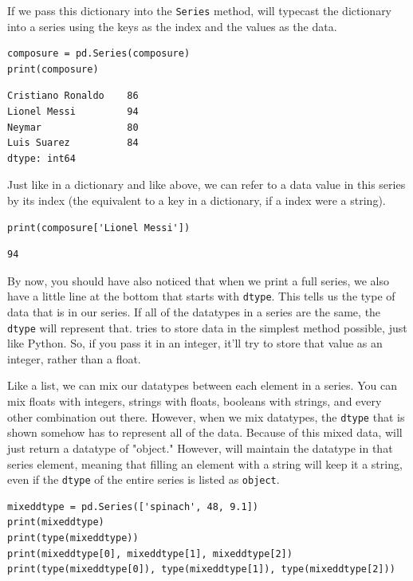 If we pass this dictionary into the \verb|Series| method,  will typecast the dictionary into a series using the keys as the index and the values as the data.
\begin{lstlisting}[style=pippython]
composure = pd.Series(composure)
print(composure)
\end{lstlisting}
\begin{lstlisting}
Cristiano Ronaldo    86
Lionel Messi         94
Neymar               80
Luis Suarez          84
dtype: int64
\end{lstlisting}
Just like in a dictionary and like above, we can refer to a data value in this series by its index (the equivalent to a key in a dictionary, if a index were a string).
\begin{lstlisting}[style=pippython]
print(composure['Lionel Messi'])
\end{lstlisting}
\begin{lstlisting}
94
\end{lstlisting}
By now, you should have also noticed that when we print a full series, we also have a little line at the bottom that starts with \verb|dtype|. This tells us the type of data that is in our series. If all of the datatypes in a series are the same, the \verb|dtype| will represent that.  tries to store data in the simplest method possible, just like Python. So, if you pass it in an integer, it'll try to store that value as an integer, rather than a float.\par
Like a list, we can mix our datatypes between each element in a series. You can mix floats with integers, strings with floats, booleans with strings, and every other combination out there. However, when we mix datatypes, the \verb|dtype| that is shown somehow has to represent all of the data. Because of this mixed data,  will just return a datatype of "object." However,  will maintain the datatype in that series element, meaning that filling an element with a string will keep it a string, even if the \verb|dtype| of the entire series is listed as \verb|object|.
\begin{lstlisting}[style=pippython]
mixeddtype = pd.Series(['spinach', 48, 9.1])
print(mixeddtype)
print(type(mixeddtype))
print(mixeddtype[0], mixeddtype[1], mixeddtype[2])
print(type(mixeddtype[0]), type(mixeddtype[1]), type(mixeddtype[2]))
\end{lstlisting}
